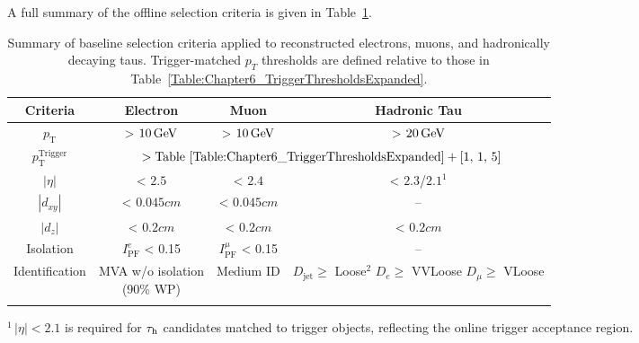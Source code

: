 A full summary of the offline selection criteria is given in Table~\ref{Table:Chapter6_ObjectSelectionSummary}.

{
\setlength{\arrayrulewidth}{1pt}

\begin{table}[!htbp]
\centering
\caption[Summary of baseline object selection criteria]{
Summary of baseline selection criteria applied to reconstructed electrons, muons, and hadronically decaying taus. Trigger-matched $p_T$ thresholds are defined relative to those in Table~\ref{Table:Chapter6_TriggerThresholdsExpanded}.
}
\label{Table:Chapter6_ObjectSelectionSummary}

\renewcommand{\arraystretch}{1.5}
\setlength{\tabcolsep}{12pt}

\begin{tabular}{cccc}
\hline
Criteria & Electron & Muon & Hadronic Tau \\
\hline

$p_\text{T}$  & > $10\,\text{Ge\hspace{-.08em}V}$ & > $10\,\text{Ge\hspace{-.08em}V}$ & > $20\,\text{Ge\hspace{-.08em}V}$\\ 
\arrayrulecolor{lightgray} \hline

$p_\text{T}^{\text{Trigger}}$ & \multicolumn{3}{c}{$> \text{Table~\ref{Table:Chapter6_TriggerThresholdsExpanded}} + [1,\,1,\,5]$} \\
\arrayrulecolor{lightgray} \hline

$|\eta|$ & < $2.5$ & < $2.4$ & < $2.3$/$2.1$\hyperlink{DoubleTauTrigger-EtaCut}{$^1$} \\
\arrayrulecolor{lightgray} \hline

$|d_{xy}|$ & < $0.045\unit{cm}$ & < $0.045\unit{cm}$ & -- \\
\arrayrulecolor{lightgray} \hline

$|d_z|$ & < $0.2\unit{cm}$ & < $0.2\unit{cm}$ & < $0.2\unit{cm}$ \\
\arrayrulecolor{lightgray} \hline

Isolation & $I^e_\text{PF}$ < 0.15 & $I^\mu_\text{PF}$ < 0.15 & -- \\
\arrayrulecolor{lightgray} \hline

Identification
& \makecell{MVA w/o isolation\\(90\% WP)}
& Medium ID
& \makecell{
\normalfont\footnotesize$D_{\text{jet}} \geq$ Loose\hyperlink{Alternative-FFcut}{$^2$} \\
\normalfont\footnotesize$D_{e} \geq$ VVLoose \\
\normalfont\footnotesize$D_{\mu} \geq$ VLoose
} \\
\arrayrulecolor{black} \hline
\end{tabular}
\vspace{0.5em}
\begin{minipage}{0.95\linewidth}
\raggedright
\footnotesize
\hypertarget{DoubleTauTrigger-EtaCut}{}$^{1}$\,$|\eta| < 2.1$ is required for $\tau_\mathrm{h}$ candidates matched to trigger objects, reflecting the online trigger acceptance region. \\


\end{minipage}
\end{table}}
